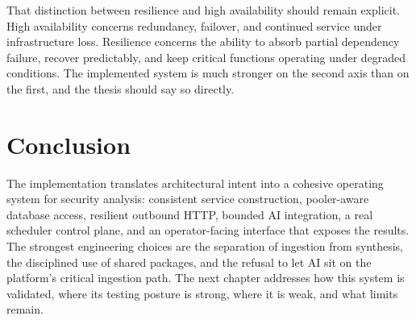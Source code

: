 That distinction between resilience and high availability should remain explicit. High availability concerns redundancy, failover, and continued service under infrastructure loss. Resilience concerns the ability to absorb partial dependency failure, recover predictably, and keep critical functions operating under degraded conditions. The implemented system is much stronger on the second axis than on the first, and the thesis should say so directly.

\section*{Conclusion}
The implementation translates architectural intent into a cohesive operating system for security analysis: consistent service construction, pooler-aware database access, resilient outbound HTTP, bounded AI integration, a real scheduler control plane, and an operator-facing interface that exposes the results. The strongest engineering choices are the separation of ingestion from synthesis, the disciplined use of shared packages, and the refusal to let AI sit on the platform's critical ingestion path. The next chapter addresses how this system is validated, where its testing posture is strong, where it is weak, and what limits remain.
